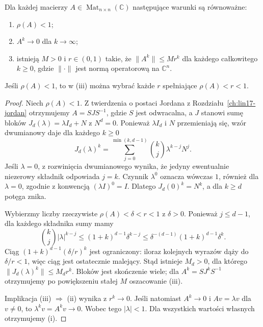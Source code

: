 \begin{lemat}
\label{lem:lin23-powers}
Dla każdej macierzy
\(A\in\operatorname{Mat}_{n\times n}(\mathbb C)\)
następujące warunki są równoważne:
\begin{enumerate}[label=\textup{(\roman*)}]
 \item \(\rho(A)<1\);
 \item \(A^k\to0\) dla \(k\to\infty\);
 \item istnieją \(M>0\) i \(r\in(0,1)\)
 takie, że
 \(\|A^k\|\le Mr^k\) dla każdego
 całkowitego \(k\ge0\),
 gdzie \(\|\cdot\|\) jest normą
 operatorową na \(\mathbb C^n\).
\end{enumerate}
Jeśli \(\rho(A)<1\), to
w \textup{(iii)} można wybrać
każde \(r\) spełniające
\(\rho(A)<r<1\).
\end{lemat}
\begin{proof}
Niech \(\rho(A)<1\).
Z twierdzenia o postaci Jordana
z Rozdziału~\ref{ch:lin17-jordan}
otrzymujemy \(A=SJS^{-1}\),
gdzie \(S\) jest odwracalna,
a \(J\) stanowi sumę bloków
\(J_d(\lambda)=\lambda I_d+N\)
z \(N^d=0\).
Ponieważ \(\lambda I_d\) i \(N\)
przemieniają się, wzór dwumianowy
daje dla każdego \(k\ge0\)
\[
 J_d(\lambda)^k
 =\sum_{j=0}^{\min(k,d-1)}
 \binom{k}{j}\lambda^{k-j}N^j.
\]
Jeśli \(\lambda=0\),
z rozwinięcia dwumianowego wynika,
że jedyny ewentualnie niezerowy
składnik odpowiada \(j=k\).
Czynnik \(\lambda^0\) oznacza
wówczas \(1\), również dla
\(\lambda=0\), zgodnie z
konwencją \((\lambda I)^0=I\).
Dlatego \(J_d(0)^k=N^k\),
a dla \(k\ge d\) potęga znika.

Wybierzmy liczby rzeczywiste
\(\rho(A)<\delta<r<1\)
z \(\delta>0\).
Ponieważ \(j\le d-1\),
dla każdego składnika sumy mamy
\[
 \binom{k}{j}|\lambda|^{k-j}
 \le(1+k)^{d-1}\delta^{k-j}
 \le\delta^{-(d-1)}
       (1+k)^{d-1}\delta^k.
\]
Ciąg
\((1+k)^{d-1}(\delta/r)^k\)
jest ograniczony: iloraz kolejnych
wyrazów dąży do \(\delta/r<1\),
więc ciąg jest ostatecznie malejący.
Stąd istnieje \(M_d>0\),
dla którego
\(\|J_d(\lambda)^k\|\le M_dr^k\).
Bloków jest skończenie wiele;
dla \(A^k=SJ^kS^{-1}\)
otrzymujemy po powiększeniu
stałej \(M\) oszacowanie (iii).

Implikacja (iii) \(\Rightarrow\) (ii)
wynika z \(r^k\to0\).
Jeśli natomiast \(A^k\to0\)
i \(Av=\lambda v\) dla \(v\ne0\),
to \(\lambda^kv=A^kv\to0\).
Wobec tego \(|\lambda|<1\).
Dla wszystkich wartości własnych
otrzymujemy (i).
\end{proof}

